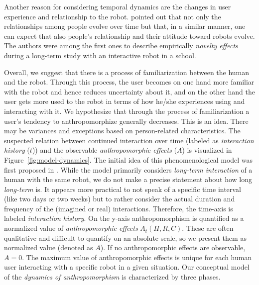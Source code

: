 \documentclass{frontiersSCNS} %
\begin{document}
Another reason for considering temporal dynamics are the changes in user experience \citep{karapanos_user_2009} and relationship to the robot. \cite{kanda_interactive_2004} pointed out that not only the relationships among people evolve over time but that, in a similar manner, one can expect that also people's relationship and their attitude toward robots evolve. The authors were among the first ones to describe empirically \textit{novelty effects} during a long-term study with an interactive robot in a school.

Overall, we suggest that there is a process of familiarization between the human and the robot. Through this process, the user becomes on one hand more familiar with the robot and hence reduces uncertainty about it, and on the other hand the user gets more used to the robot in terms of how he/she experiences using and interacting with it. We hypothesize that through the process of familiarization a user's tendency to anthropomorphize generally decreases. This is an idea. There may be variances and exceptions based on person-related characteristics. The suspected relation between continued interaction over time (labeled as \textit{interaction history} ($t$)) and the observable \textit{anthropomorphic effects} ($A$) is visualized in Figure~\ref{fig:model-dynamics}. The initial idea of this phenomenological model was first proposed in \cite{lemaignan_dynamics_2014}. While the model primarily considers \textit{long-term interaction} of a human with the same robot, we do not make a precise statement about how long \textit{long-term} is. It appears more practical to not speak of a specific time interval (like two days or two weeks) but to rather consider the actual duration and frequency of the (imagined or real) interactions. Therefore, the time-axis is labeled \textit{interaction history}. 
On the y-axis anthropomorphism is quantified as a normalized value of \textit{anthropomorphic effects} $A_t(H,R,C)$. These are often qualitative and difficult to quantify on an absolute scale, so we present them as normalized value (denoted as $A$). If no anthropomorphic effects are observable, $A=0$. The maximum value of anthropomorphic effects is unique for each human user interacting with a specific robot in a given situation.
Our conceptual model of the \textit{dynamics of anthropomorphism} is characterized by three phases.
\end{document}
